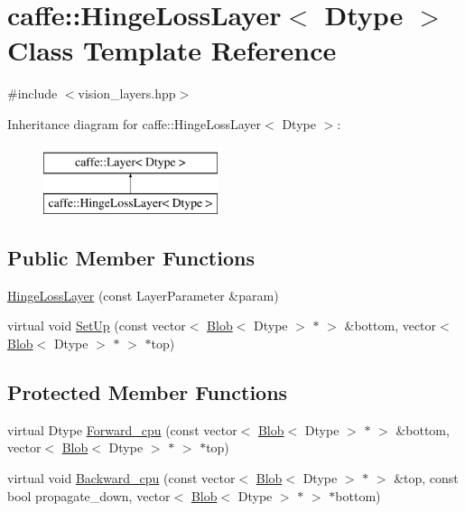 \hypertarget{classcaffe_1_1_hinge_loss_layer}{\section{caffe\+:\+:Hinge\+Loss\+Layer$<$ Dtype $>$ Class Template Reference}
\label{classcaffe_1_1_hinge_loss_layer}
}


{\ttfamily \#include $<$vision\+\_\+layers.\+hpp$>$}

Inheritance diagram for caffe\+:\+:Hinge\+Loss\+Layer$<$ Dtype $>$\+:\begin{figure}[H]
\begin{center}
\leavevmode
\includegraphics[height=2.000000cm]{classcaffe_1_1_hinge_loss_layer}
\end{center}
\end{figure}
\subsection*{Public Member Functions}
\begin{DoxyCompactItemize}
\item 
\hyperlink{classcaffe_1_1_hinge_loss_layer_a358a5bd2625bb7fed61052dd8e1cb588}{Hinge\+Loss\+Layer} (const Layer\+Parameter \&param)
\item 
virtual void \hyperlink{classcaffe_1_1_hinge_loss_layer_a6674ffab4fc6a97a1545801dad068d42}{Set\+Up} (const vector$<$ \hyperlink{classcaffe_1_1_blob}{Blob}$<$ Dtype $>$ $\ast$ $>$ \&bottom, vector$<$ \hyperlink{classcaffe_1_1_blob}{Blob}$<$ Dtype $>$ $\ast$ $>$ $\ast$top)
\end{DoxyCompactItemize}
\subsection*{Protected Member Functions}
\begin{DoxyCompactItemize}
\item 
virtual Dtype \hyperlink{classcaffe_1_1_hinge_loss_layer_a1e6922952af5ac6989b080ef8cf0c89a}{Forward\+\_\+cpu} (const vector$<$ \hyperlink{classcaffe_1_1_blob}{Blob}$<$ Dtype $>$ $\ast$ $>$ \&bottom, vector$<$ \hyperlink{classcaffe_1_1_blob}{Blob}$<$ Dtype $>$ $\ast$ $>$ $\ast$top)
\item 
virtual void \hyperlink{classcaffe_1_1_hinge_loss_layer_a467c0d92debbaddecf6b18d4bbc31526}{Backward\+\_\+cpu} (const vector$<$ \hyperlink{classcaffe_1_1_blob}{Blob}$<$ Dtype $>$ $\ast$ $>$ \&top, const bool propagate\+\_\+down, vector$<$ \hyperlink{classcaffe_1_1_blob}{Blob}$<$ Dtype $>$ $\ast$ $>$ $\ast$bottom)
\end{DoxyCompactItemize}

